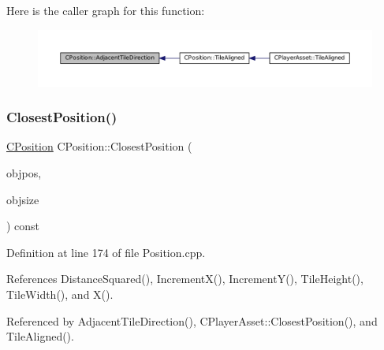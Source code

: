 Here is the caller graph for this function\+:\nopagebreak
\begin{figure}[H]
\begin{center}
\leavevmode
\includegraphics[width=350pt]{classCPosition_a2295901e4c35cfc81304f9a217e34ac7_icgraph}
\end{center}
\end{figure}
\hypertarget{classCPosition_a91fd43eeb2c894bcb7577ae87247b726}{}\label{classCPosition_a91fd43eeb2c894bcb7577ae87247b726} 
\subsubsection{\texorpdfstring{Closest\+Position()}{ClosestPosition()}}
{\footnotesize\ttfamily \hyperlink{classCPosition}{C\+Position} C\+Position\+::\+Closest\+Position (\begin{DoxyParamCaption}\item[{const \hyperlink{classCPosition}{C\+Position} \&}]{objpos,  }\item[{int}]{objsize }\end{DoxyParamCaption}) const}



Definition at line 174 of file Position.\+cpp.



References Distance\+Squared(), Increment\+X(), Increment\+Y(), Tile\+Height(), Tile\+Width(), and X().



Referenced by Adjacent\+Tile\+Direction(), C\+Player\+Asset\+::\+Closest\+Position(), and Tile\+Aligned().


